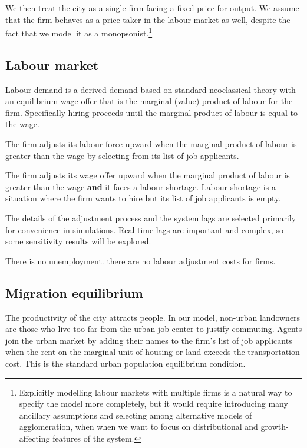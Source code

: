 We then treat the city as a single firm facing a fixed price for output. We assume that the firm behaves as a price taker in the labour market as well, despite  the fact that we  model it as a monopsonist.\footnote{Explicitly modelling labour markets with multiple firms is a natural way to specify the model more completely, but it would require introducing many ancillary assumptions and selecting among alternative models of agglomeration, when when we want to focus on distributional and growth-affecting features of the system.}



\subsection{Labour market}
Labour demand is a derived demand based on standard neoclassical theory with an equilibrium wage offer that is the marginal (value) product of labour for the firm. Specifically  hiring proceeds until the marginal product of labour  is equal to the wage.

The firm adjusts its labour force upward when the marginal product of labour is greater than the wage by selecting from its list of job applicants.

The firm adjusts its wage offer upward when the marginal product of labour is greater than the wage \textbf{and} it faces a labour shortage.  Labour shortage is a situation where the firm wants to hire but its list of job applicants is empty.

{\color{red}The details of the adjustment process and the system lags are selected primarily for convenience in simulations. Real-time lags are important and complex, so some sensitivity results will be explored.}

There is no unemployment. there are no labour adjustment costs for firms.



\subsection{Migration equilibrium}
The  productivity of the city attracts people.  In our model, non-urban landowners are those who live too far from the urban job center to justify commuting.  Agents join the urban market by adding their names to the firm's list of job applicants when the rent  on the marginal unit of housing or land exceeds the transportation cost. This is the  standard urban population equilibrium condition. 
   
